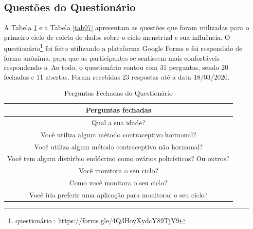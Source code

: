 \subsection{Questões do Questionário}

A Tabela \ref{tab06} e a Tabela \ref{tab07} apresentam as questões que foram utilizadas para o primeiro ciclo de coleta de dados sobre o ciclo menstrual e 
sua influência. O questionário\footnote{questionário : https://forms.gle/4Q3HoyXydcY89TjY9} foi feito utilizando a plataforma Google Forms e foi respondido de forma anônima, para que as
participantes se sentissem mais confortáveis respondendo-o. Ao todo, o questionário contou com 31 perguntas, sendo 20 fechadas e 
11 abertas. Foram recebidas 23 respostas até a data 18/03/2020.

\begin{table}[ht]
	\centering
	\caption{Perguntas Fechadas do Questionário}
	\label{tab06}
	\begin{tabular}{c}
		\toprule
		\textbf{Perguntas fechadas} \\
        \midrule
        \begin{minipage} [t] {1\textwidth} Qual a sua idade?  \end{minipage} \\
        \midrule
        \begin{minipage} [t] {1\textwidth} Você utiliza algum método contraceptivo hormonal?   \end{minipage}\\
        \midrule
        \begin{minipage} [t] {1\textwidth} Você utiliza algum método contraceptivo não hormonal?  \end{minipage} \\
        \midrule
        \begin{minipage} [t] {1\textwidth}  Você tem algum distúrbio endócrino como ovários policísticos? Ou outros? \end{minipage}  \\
        \midrule
        \begin{minipage} [t] {1\textwidth}  Você monitora o seu ciclo? \end{minipage}\\
        \midrule
        \begin{minipage} [t] {1\textwidth}  Como você monitora o seu ciclo? \end{minipage} \\
        \midrule
        \begin{minipage} [t] {1\textwidth}  Você iria preferir uma aplicação para monitorar o seu ciclo?\end{minipage}\\

\end{tabular}
\end{table}
